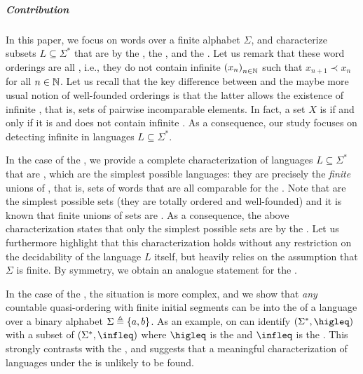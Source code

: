 \subparagraph{Contribution} 
\AP
In this paper, we focus on words over a finite
alphabet $\Sigma$, and characterize subsets $L \subseteq \Sigma^*$ that are
 by the , the ,
and the . Let us remark that these word orderings are all
, i.e., they do not contain infinite  $\seqof{x_n}$ such that $x_{n+1} \prec x_n$ for all $n \in \mathbb{N}$.
Let us recall that the key difference between  and the
maybe more usual notion of well-founded orderings is that the latter allows the
existence of infinite , that is, sets of pairwise
incomparable elements. In fact, a set $X$ is  if and
only if it is  and does not contain infinite 
\cite{KRU72}.  As a consequence, our study focuses on detecting infinite
 in languages $L \subseteq \Sigma^*$.

In the case of the , we provide a complete characterization
of languages $L \subseteq \Sigma^*$ that are , which are
the simplest possible languages: they are precisely the \emph{finite} unions of
, that is, sets of words that are all comparable for the
. Note that  are the simplest possible
 sets (they are totally ordered and well-founded) and it
is known that finite unions of  sets are
. As a consequence, the above characterization states
that only the simplest possible  sets are
 by the . Let us furthermore
highlight that this characterization holds without any restriction on the
decidability of the language $L$ itself, but heavily relies on the assumption
that $\Sigma$ is finite. By symmetry, we obtain an analogue statement for the
.

In the case of the , the situation is more complex, and we
show that \emph{any} countable quasi-ordering with finite initial segments can
be  into the  of a language over a binary
alphabet $\Sigma \triangleq \{ a,b \}$. As an example, on can identify
$(\Sigma^*, \higleq)$ with a subset of $(\Sigma^*, \infleq)$ where $\higleq$ is
the  and $\infleq$ is the . This
strongly contrasts with the , and suggests that a
meaningful characterization of  languages under the
 is unlikely to be found. 

